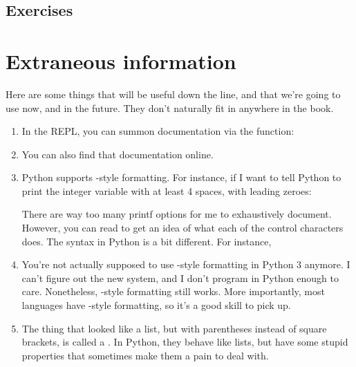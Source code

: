 \subsection{Exercises}


\section{Extraneous information}

Here are some things that will be useful down the line, and that we're
going to use now, and in the future. They don't naturally fit in
anywhere in the book.

\begin{enumerate}
\item In the REPL, you can summon documentation via the 
  function:

\item You can also find that documentation online.
\item Python supports -style formatting. For instance, if
  I want to tell Python to print the integer variable  with at
  least 4 spaces, with leading zeroes:


  There are way too many printf options for me to exhaustively
  document. However, you can read  to get an idea of
  what each of the control characters does. The syntax in Python is a
  bit different. For instance, 


\item You're not actually supposed to use -style
  formatting in Python 3 anymore. I can't figure out the new system,
  and I don't program in Python enough to care. Nonetheless,
  -style formatting still works. More importantly, most
  languages have -style formatting, so it's a good skill
  to pick up.

\item The thing that looked like a list, but with parentheses instead
  of square brackets, is called a . In Python, they behave
  like lists, but have some stupid properties that sometimes make them
  a pain to deal with.


\end{enumerate}
